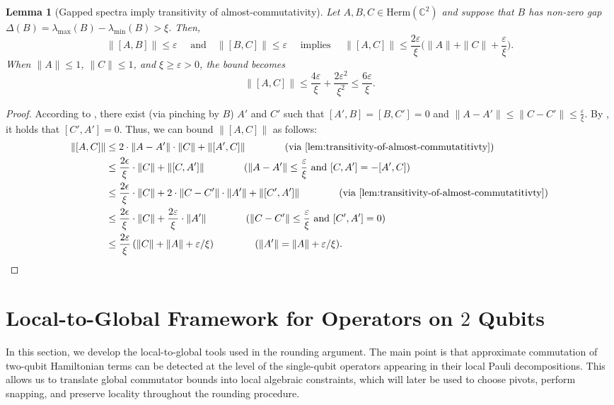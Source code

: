 \documentclass[a4paper,onecolumn,11pt]{quantumarticle}
\theoremstyle{plain}
\newtheorem{lemma}[theorem]{Lemma}
\newcommand{\eps}{\varepsilon}
\begin{document}
\begin{lemma}[Gapped spectra imply transitivity of almost-commutativity]\label{lem:transitivity-almost}
    Let $A,B,C \in \mathrm{Herm}(\mathbb{C}^{2})$ and suppose that $B$ has non-zero gap $\Delta(B)=\lambda_{\max}(B) - \lambda_{\min}(B) > \xi$. Then, 
$$
\|[A,B]\| \leq \eps \quad \text{ and} \quad \|[B,C]\| \leq \eps \quad \text{ implies } \quad \|[A,C]\| \leq \frac{2\eps}{\xi}\Big(\|A\| + \|C\| + \frac{\eps}{\xi} \Big) .
$$
When $\|A\|\leq 1$, $\|C\|\leq 1$, and $\xi \geq  \eps >0$, the bound becomes \[\|[A, C]\| \leq \frac{4\eps}{\xi} + \frac{2\eps^2}{\xi^2} \leq \frac{6\eps}{\xi}.\]
\end{lemma}
\begin{proof}
 According to , there exist (via pinching by $B$) $A'$ and $C'$ such that $[A', B] = [B, C'] = 0$ and $\|A - A'\| \leq \|C - C'\| \leq \frac{\eps}{\xi}$. By , it holds that $[C', A'] = 0$. Thus, we can bound $\|[A, C]\|$ as follows:
    \begin{align*}
        \|[A,C]\| & \leq 2 \cdot \|A - A'\| \cdot \|C\| + \|[A', C]\| \qquad \qquad \text{(via \Cref{lem:transitivity-of-almost-commutatitivty})}\\
        &\leq \frac{2\epsilon}{\xi} \cdot \|C\| + \|[C, A']\| \qquad\qquad(\|A - A'\| \leq \frac{\eps}{\xi} \text{ and } [C,A'] = -[A',C])\\
        &\leq \frac{2\epsilon}{\xi} \cdot \|C\| + 2 \cdot \|C - C'\| \cdot \|A'\| + \|[C',A']\|  \qquad\qquad \text{(via \Cref{lem:transitivity-of-almost-commutatitivty})}\\
        & \leq \frac{2\epsilon}{\xi} \cdot \|C\| + \frac{2\eps}{\xi} \cdot \|A'\| \qquad \qquad (\|C - C'\| \leq \frac{\eps}{\xi} \text{ and } [C', A'] = 0)\\
        & \leq \frac{2\eps}{\xi} \left(\|C\| + \|A\| + \eps/\xi \right) \qquad  \qquad (\|A'\| = \|A\| + \eps/\xi).
    \end{align*}
\end{proof}

\section{Local-to-Global Framework for Operators on $2$ Qubits}

In this section, we develop the local-to-global tools used in the rounding
argument.  The main point is that approximate commutation of two-qubit
Hamiltonian terms can be detected at the level of the single-qubit
operators appearing in their local Pauli decompositions.  This allows us to
translate global commutator bounds into local algebraic constraints, which
will later be used to choose pivots, perform snapping, and preserve locality
throughout the rounding procedure.
\end{document}
